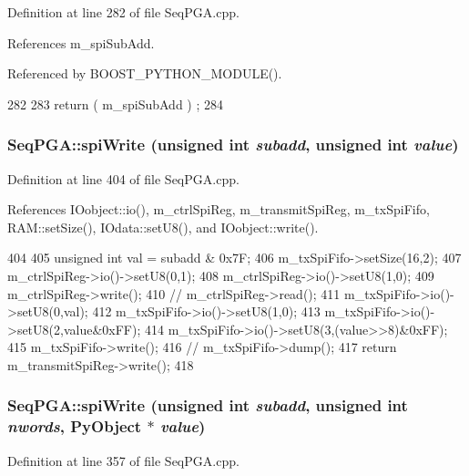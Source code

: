 Definition at line 282 of file SeqPGA.cpp.

References m\_\-spiSubAdd.

Referenced by BOOST\_\-PYTHON\_\-MODULE().


\begin{DoxyCode}
282                                    {
283   return ( m_spiSubAdd ) ;
284 }
\end{DoxyCode}
\hypertarget{classSeqPGA_a3cc382925053df4b2fc7d3a99b4def20}{
\subsubsection[{spiWrite}]{ SeqPGA::spiWrite (unsigned int {\em subadd}, \/  unsigned int {\em value})}}
\label{classSeqPGA_a3cc382925053df4b2fc7d3a99b4def20}


Definition at line 404 of file SeqPGA.cpp.

References IOobject::io(), m\_\-ctrlSpiReg, m\_\-transmitSpiReg, m\_\-txSpiFifo, RAM::setSize(), IOdata::setU8(), and IOobject::write().


\begin{DoxyCode}
404                                                                   {
405   unsigned int val = subadd & 0x7F; 
406   m_txSpiFifo->setSize(16,2);
407   m_ctrlSpiReg->io()->setU8(0,1);
408   m_ctrlSpiReg->io()->setU8(1,0);
409   m_ctrlSpiReg->write();
410   //  m_ctrlSpiReg->read();
411   m_txSpiFifo->io()->setU8(0,val);
412   m_txSpiFifo->io()->setU8(1,0);
413   m_txSpiFifo->io()->setU8(2,value&0xFF);
414   m_txSpiFifo->io()->setU8(3,(value>>8)&0xFF);
415   m_txSpiFifo->write();
416   //  m_txSpiFifo->dump();
417   return m_transmitSpiReg->write();
418 }
\end{DoxyCode}
\hypertarget{classSeqPGA_a7b8af951501ccd0f763e131276c543ad}{
\subsubsection[{spiWrite}]{ SeqPGA::spiWrite (unsigned int {\em subadd}, \/  unsigned int {\em nwords}, \/  PyObject $\ast$ {\em value})}}
\label{classSeqPGA_a7b8af951501ccd0f763e131276c543ad}


Definition at line 357 of file SeqPGA.cpp.

